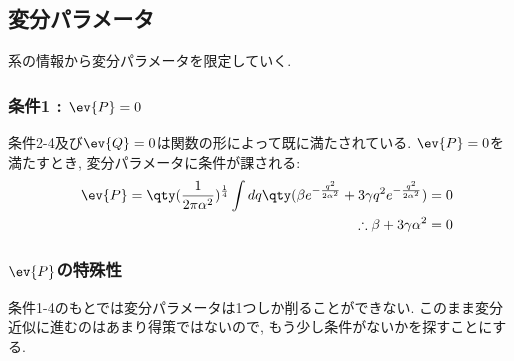 \documentclass[10.5pt,a4paper]{jreport}
\begin{document}
\subsection{変分パラメータ}
系の情報から変分パラメータを限定していく.
\subsubsection{条件1 : $\ev{P} = 0$}
条件2-4及び$\ev{Q} = 0$は関数の形によって既に満たされている. $\ev{P} = 0$を満たすとき, 変分パラメータに条件が課される:
\begin{eqnarray}
  &&\ev{P} = \qty(\frac{1}{2\pi\alpha^2})^\frac14\int dq \qty(\beta e^{-\frac{q^2}{2\alpha^2}} + 3\gamma q^2 e^{-\frac{q^2}{2\alpha^2}}) =0\\
  &&\therefore \beta + 3\gamma\alpha^2 = 0 \label{condition1}
\end{eqnarray}
\subsubsection{$\ev{P}$の特殊性}
条件1-4のもとでは変分パラメータは1つしか削ることができない. このまま変分近似に進むのはあまり得策ではないので, もう少し条件がないかを探すことにする.
\end{document}
